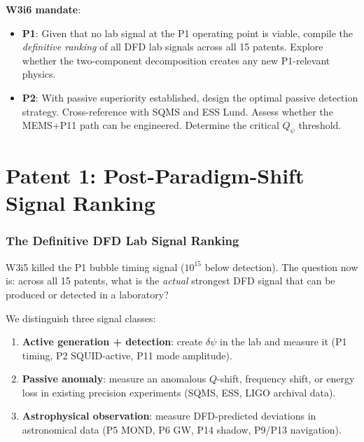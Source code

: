\documentclass[11pt]{article}
\newcommand{\dpsi}{\delta\psi}
\newcommand{\Qpsi}{Q_\psi}
\theoremstyle{definition}
\theoremstyle{remark}
\begin{document}
\noindent\textbf{W3i6 mandate}:

\begin{itemize}[nosep]
\item \textbf{P1}: Given that no lab signal at the P1 operating point is
  viable, compile the \emph{definitive ranking} of all DFD lab signals
  across all 15 patents. Explore whether the two-component decomposition
  creates any new P1-relevant physics.
\item \textbf{P2}: With passive superiority established, design the optimal
  passive detection strategy. Cross-reference with SQMS and ESS Lund.
  Assess whether the MEMS+P11 path can be engineered. Determine the
  critical $\Qpsi$ threshold.
\end{itemize}

\part{Patent 1: Post-Paradigm-Shift Signal Ranking}
\label{part:P1}

\section{The Definitive DFD Lab Signal Ranking}
\label{sec:ranking}

W3i5 killed the P1 bubble timing signal ($10^{15}$ below detection).
The question now is: across all 15 patents, what is the \emph{actual}
strongest DFD signal that can be produced or detected in a laboratory?

We distinguish three signal classes:
\begin{enumerate}[nosep]
\item \textbf{Active generation + detection}: create $\dpsi$ in the lab
  and measure it (P1 timing, P2 SQUID-active, P11 mode amplitude).
\item \textbf{Passive anomaly}: measure an anomalous $Q$-shift, frequency
  shift, or energy loss in existing precision experiments (SQMS, ESS,
  LIGO archival data).
\item \textbf{Astrophysical observation}: measure DFD-predicted deviations
  in astronomical data (P5 MOND, P6 GW, P14 shadow, P9/P13 navigation).
\end{enumerate}
\end{document}
